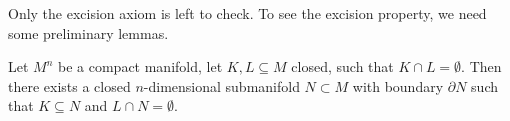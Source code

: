 \documentclass[a4paper,11pt]{article}
\begin{document}
\begin{comment}[Transversality, Sard, Mayer-Vi\"etoris,...]
Before checking the next axioms, we need to do some more differential topology. (Maybe I will put this in chapter 1\dots)

\begin{definition}[Tangent space\ \cite{lee}]
\end{definition}

Need a few more things, differential, etc.

\begin{definition}[Transversality\ \cite{brocker}]
    Let \(f:M\to N\) a smooth map between manifolds. Let \(U\subseteq N\) be an (\(n-k\))-dimensional submanifold of \(N\) 
\end{definition}
Maybe Lee's definition is better.\\

\begin{definition}[Regular value]
\end{definition}

\begin{theorem}[Sard's theorem\ \cite{lee}]
\end{theorem}

I will not prove this theorem, a proof can be found in\ \cite{lee}.

\begin{definition}[Seperating function\cite{brocker}]
\end{definition}

\begin{lemma}
    Slogan: The Mayer-Vi\"etoris sequence is equivalent to the excision axiom.
\end{lemma}

\begin{lemma}
    The Mayer-Vi\"etoris sequence
    \[\dots\xrightarrow{\partial}\mathfrak{N}_n(X_0\cap X_1)\xrightarrow{\alpha}\mathfrak{N}_n(X_0\oplus\mathfrak{N}_n(X_1))\xrightarrow{\beta}\mathfrak{N}_n(X)\xrightarrow{\partial}\mathfrak{N}_{n-1}(X_0\cap X_1)\xrightarrow{\alpha}\dots\]
    is exact.
\end{lemma}

\end{comment}

Only the excision axiom is left to check. To see the excision property, we need some preliminary lemmas.

\begin{lemma}\label{plemma}%
    Let \(M^n\) be a compact manifold, let \(K,L\subseteq M\) closed, such that \(K\cap L=\emptyset\). Then there exists a closed \(n\)-dimensional submanifold \(N\subset M\) with boundary \(\partial N\) such that \(K\subseteq N\) and \(L\cap N=\emptyset\).
\end{lemma}
\end{document}
